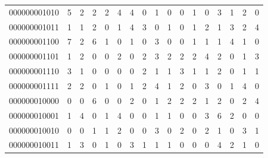 \documentclass[10pt,a4paper]{article}
\begin{document}
\begin{longtable}{ |c|c|c|c|c|c|c|c|c|c|c|c|c|c|c|c|c| }
    000000001010              & 5                            & 2                                & 2                            & 2                              & 4   & 4   & 0   & 1   & 0   & 0   & 1   & 0   & 3   & 1   & 2   & 0   \\
    000000001011              & 1                            & 1                                & 2                            & 0                              & 1   & 4   & 3   & 0   & 1   & 0   & 1   & 2   & 1   & 3   & 2   & 4   \\
    000000001100              & 7                            & 2                                & 6                            & 1                              & 0   & 1   & 0   & 3   & 0   & 0   & 1   & 1   & 1   & 4   & 1   & 0   \\
    000000001101              & 1                            & 2                                & 0                            & 0                              & 2   & 0   & 2   & 3   & 2   & 2   & 2   & 4   & 2   & 0   & 1   & 3   \\
    000000001110              & 3                            & 1                                & 0                            & 0                              & 0   & 0   & 2   & 1   & 1   & 3   & 1   & 1   & 2   & 0   & 1   & 1   \\
    000000001111              & 2                            & 2                                & 0                            & 1                              & 0   & 1   & 2   & 4   & 1   & 2   & 0   & 3   & 0   & 1   & 4   & 0   \\
    000000010000              & 0                            & 0                                & 6                            & 0                              & 0   & 2   & 0   & 1   & 2   & 2   & 2   & 1   & 2   & 0   & 2   & 4   \\
    000000010001              & 1                            & 4                                & 0                            & 1                              & 4   & 0   & 0   & 1   & 1   & 0   & 0   & 3   & 6   & 2   & 0   & 0   \\
    000000010010              & 0                            & 0                                & 1                            & 1                              & 2   & 0   & 0   & 3   & 0   & 2   & 0   & 2   & 1   & 0   & 3   & 1   \\
    000000010011              & 1                            & 3                                & 0                            & 1                              & 0   & 3   & 1   & 1   & 1   & 0   & 0   & 0   & 4   & 2   & 1   & 0   \\

\end{longtable}
\end{document}
